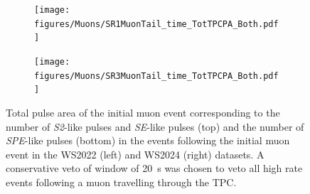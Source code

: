 \begin{figure}[ht!]
\centering
\begin{subfigure}{0.47\textwidth}
    \texttt{[image: figures/Muons/SR1MuonTail\_time\_TotTPCPA\_Both.pdf]}
    \caption{}
    \label{fig:Muons/WS2022_MuonTailHist}
\end{subfigure}
\hfill
\begin{subfigure}{0.47\textwidth}
    \texttt{[image: figures/Muons/SR3MuonTail\_time\_TotTPCPA\_Both.pdf]}
    \caption{}
    \label{fig:Muons/WS2024_MuonTailHist}
\end{subfigure}
\caption{Total pulse area of the initial muon event corresponding to the number of \textit{S2}-like pulses and \textit{SE}-like pulses (top) and the number of \textit{SPE}-like pulses (bottom) in the events following the initial muon event in the WS2022 (left) and WS2024 (right) datasets. A conservative veto of window of 20~s was chosen to veto all high rate events following a muon travelling through the TPC.}
\label{fig:MuonTailHist}
\end{figure}

